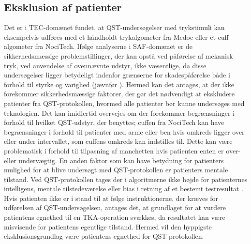 \subsection{Eksklusion af patienter}
Det er i TEC-domænet fundet, at QST-undersøgelser med trykstimuli kan eksempelvis udføres med et håndholdt trykalgometer fra Medoc eller et cuff-algometer fra NociTech. 
Ifølge analyserne i SAF-domænet er de sikkerhedsmæssige problemstillinger, der kan opstå ved påførelse af mekanisk tryk, ved anvendelse af ovennævnte udstyr, ikke væsentlige, da disse undersøgelser ligger betydeligt indenfor grænserne for skadespåførelse både i forhold til styrke og varighed (jævnfør ). Hermed kan det antages, at der ikke forekommer sikkerhedsmæssige faktorer, der gør det nødvendigt at ekskludere patienter fra QST-protokollen, hvormed alle patienter bør kunne undersøges med teknologien. Det kan imidlertid overvejes om der forekommer begrænsninger i forhold til hvilket QST-udstyr, der benyttes; cuffen fra NociTech kan have begrænsninger i forhold til patienter med arme eller ben hvis omkreds ligger over eller under intervallet, som cuffens omkreds kan indstilles til. Dette kan være problematisk i forhold til tilpasning af manchetten hvis patienten enten er over- eller undervægtig. En anden faktor som kan have betydning for patienters mulighed for at blive undersøgt med QST-protokollen er patienters mentale tilstand. Ved QST-protokollen tages der i algoritmerne ikke højde for patienternes intelligens, mentale tilstedeværelse eller bias i retning af et bestemt testresultat \citep{Dyck1998}. 
Hvis patienten ikke er i stand til at følge instruktionerne, der kræves for udførelsen af QST-undersøgelsen, antages det, at grundlaget for at vurdere patientens egnethed til en TKA-operation svækkes, da resultatet kan være misvisende for patientens egentlige tilstand. Hermed vil den hyppigste eksklusionsgrundlag være patientens egnethed for QST-protokollen.

